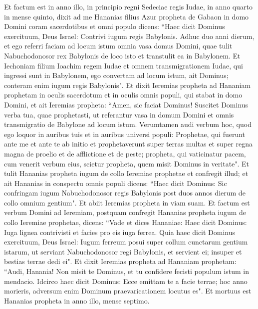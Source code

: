 \begin{biblechapter}  
\verse Et factum est in anno illo, in principio regni Sedeciae regis Iudae, in anno quarto in mense quinto, dixit ad me Hananias filius Azur propheta de Gabaon in domo Domini coram sacerdotibus et omni populo dicens: 
\verse “Haec dicit Dominus exercituum, Deus Israel: Contrivi iugum regis Babylonis. 
\verse Adhuc duo anni dierum, et ego referri faciam ad locum istum omnia vasa domus Domini, quae tulit Nabuchodonosor rex Babylonis de loco isto et transtulit ea in Babylonem.  
\verse Et Iechoniam filium Ioachim regem Iudae et omnem transmigrationem Iudae, qui ingressi sunt in Babylonem, ego convertam ad locum istum, ait Dominus; conteram enim iugum regis Babylonis". 
\verse Et dixit Ieremias propheta ad Hananiam prophetam in oculis sacerdotum et in oculis omnis populi, qui stabat in domo Domini, 
\verse et ait Ieremias propheta: “Amen, sic faciat Dominus! Suscitet Dominus verba tua, quae prophetasti, ut referantur vasa in domum Domini et omnis transmigratio de Babylone ad locum istum. 
\verse Verumtamen audi verbum hoc, quod ego loquor in auribus tuis et in auribus universi populi: 
\verse Prophetae, qui fuerunt ante me et ante te ab initio et prophetaverunt super terras multas et super regna magna de proelio et de afflictione et de peste; 
\verse propheta, qui vaticinatur pacem, cum venerit verbum eius, scietur propheta, quem misit Dominus in veritate". 
\verse Et tulit Hananias propheta iugum de collo Ieremiae prophetae et confregit illud; 
\verse et ait Hananias in conspectu omnis populi dicens: “Haec dicit Dominus: Sic confringam iugum Nabuchodonosor regis Babylonis post duos annos dierum de collo omnium gentium". Et abiit Ieremias propheta in viam suam. 
\verse Et factum est verbum Domini ad Ieremiam, postquam confregit Hananias propheta iugum de collo Ieremiae prophetae, dicens: 
\verse “Vade et dices Hananiae: Haec dicit Dominus: Iuga lignea contrivisti et facies pro eis iuga ferrea. 
\verse Quia haec dicit Dominus exercituum, Deus Israel: Iugum ferreum posui super collum cunctarum gentium istarum, ut serviant Nabuchodonosor regi Babylonis, et servient ei; insuper et bestias terrae dedi ei". 
\verse Et dixit Ieremias propheta ad Hananiam prophetam: “Audi, Hanania! Non misit te Dominus, et tu confidere fecisti populum istum in mendacio. 
\verse Idcirco haec dicit Dominus: Ecce emittam te a facie terrae; hoc anno morieris, adversum enim Dominum praevaricationem locutus es". 
\verse Et mortuus est Hananias propheta in anno illo, mense septimo. 
\end{biblechapter}

